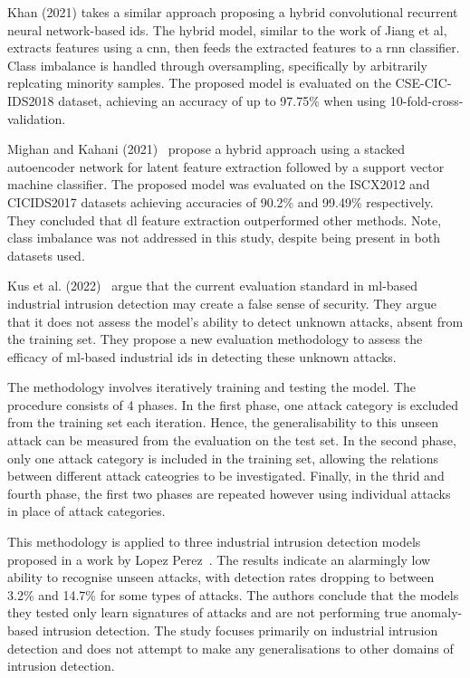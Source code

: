 Khan (2021) takes a similar approach proposing a hybrid convolutional recurrent
neural network-based \gls{ids}. The hybrid model, similar to the work of Jiang
et al, extracts features using a \gls{cnn}, then feeds the extracted features
to a \gls{rnn} classifier. Class imbalance is handled through oversampling,
specifically by arbitrarily replcating minority samples. The proposed model is
evaluated on the CSE-CIC-IDS2018 dataset, achieving an accuracy of up to
97.75\% when using 10-fold-cross-validation.

Mighan and Kahani (2021)~\cite{} propose a hybrid approach using a stacked
autoencoder network for latent feature extraction followed by a support vector
machine classifier. The proposed model was evaluated on the ISCX2012 and CICIDS2017
datasets achieving accuracies of 90.2\% and 99.49\% respectively. They
concluded that \gls{dl} feature extraction outperformed other methods. Note,
class imbalance was not addressed in this study, despite being present in both
datasets used.

Kus et al. (2022)~\cite{} argue that the current evaluation standard in
\gls{ml}-based industrial intrusion detection may create a false sense of
security. They argue that it does not assess the model's ability to detect
unknown attacks, absent from the training set. They propose a new evaluation
methodology to assess the efficacy of \gls{ml}-based industrial \gls{ids} in
detecting these unknown attacks.

The methodology involves iteratively training and testing the model. The
procedure consists of 4 phases. In the first phase, one attack category is
excluded from the training set each iteration. Hence, the generalisability to
this unseen attack can be measured from the evaluation on the test set. In the
second phase, only one attack category is included in the training set,
allowing the relations between different attack cateogries to be investigated.
Finally, in the thrid and fourth phase, the first two phases are repeated
however using individual attacks in place of attack categories.

This methodology is applied to three industrial intrusion detection models
proposed in a work by Lopez Perez~\cite{}. The results indicate an alarmingly
low ability to recognise unseen attacks, with detection rates dropping to
between 3.2\% and 14.7\% for some types of attacks. The authors conclude that
the models they tested only learn signatures of attacks and are not performing
true anomaly-based intrusion detection. The study focuses primarily on
industrial intrusion detection and does not attempt to make any generalisations
to other domains of intrusion detection.
